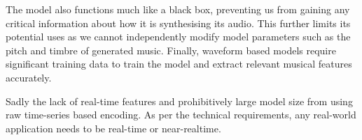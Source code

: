 The model also functions much like a black box, preventing us from gaining any critical information about how it is synthesising its audio. This further limits its potential uses as we cannot independently modify model parameters such as the pitch and timbre of generated music. Finally, waveform based models require significant training data to train the model and extract relevant musical features accurately.

Sadly the lack of real-time features and prohibitively large model size from using raw time-series based encoding. As per the technical requirements, any real-world application needs to be real-time or near-realtime.